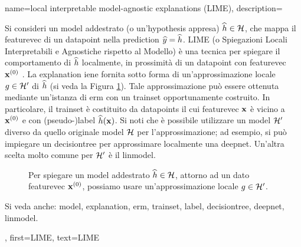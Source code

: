 {name={local interpretable model-agnostic explanations (LIME)},
	description={Si consideri 
		un \gls{model} addestrato (o un'\gls{hypothesis} appresa) $\widehat{h} \in \mathcal{H}$, 
		che mappa il \gls{featurevec} di un \gls{datapoint} nella \gls{prediction} $\widehat{y}= \widehat{h}$. 
		LIME (o Spiegazioni Locali Interpretabili e Agnostiche rispetto al Modello) è una tecnica per spiegare il comportamento 
		di $\widehat{h}$ localmente, in prossimità di un \gls{datapoint} con \gls{featurevec} ${\bf x}^{(0)}$ \cite{Ribeiro2016}. 
		La \gls{explanation} iene fornita sotto forma di un'approssimazione locale $g \in \mathcal{H}'$ di $\widehat{h}$ 
		(si veda la Figura \ref{fig_lime_dict}). Tale approssimazione può essere ottenuta mediante un'istanza di \gls{erm} 
		con un \gls{trainset} opportunamente costruito. In particolare, il \gls{trainset} è costituito da \glspl{datapoint} 
		il cui \gls{featurevec} ${\bf x}$ è vicino a ${\bf x}^{(0)}$ e con (pseudo-)\gls{label} $\widehat{h}({\bf x})$. 
		Si noti che è possibile utilizzare un \gls{model} $\mathcal{H}'$ diverso da quello originale \gls{model} $\mathcal{H}$ 
		per l'approssimazione; ad esempio, si può impiegare un \gls{decisiontree} per approssimare localmente una \gls{deepnet}. 
		Un'altra scelta molto comune per $\mathcal{H}'$ è il \gls{linmodel}. 
		\begin{figure}[H]
		\begin{center}
		\end{center}
		\caption{Per spiegare un \gls{model} addestrato $\widehat{h} \in \mathcal{H}$, attorno ad 
		un dato \gls{featurevec} ${\bf x}^{(0)}$, possiamo usare un'approssimazione locale $g \in \mathcal{H}'$. }
		\label{fig_lime_dict}
		\end{figure}
		Si veda anche: \gls{model}, \gls{explanation}, \gls{erm}, \gls{trainset}, \gls{label}, \gls{decisiontree}, \gls{deepnet}, \gls{linmodel}.},
	first={LIME},
	text={LIME}
}



